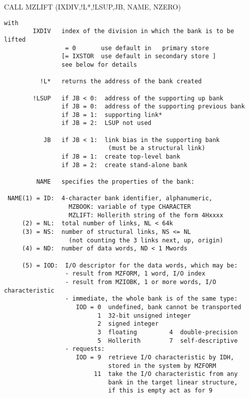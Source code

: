        {CALL MZLIFT (IXDIV,!L*,!LSUP,JB, NAME, NZERO)}
\begin{verbatim}
with
        IXDIV   index of the division in which the bank is to be lifted
                 = 0       use default in   primary store
                [= IXSTOR  use default in secondary store ]
                see below for details

          !L*   returns the address of the bank created

        !LSUP   if JB < 0:  address of the supporting up bank
                if JB = 0:  address of the supporting previous bank
                if JB = 1:  supporting link*
                if JB = 2:  LSUP not used

           JB   if JB < 1:  link bias in the supporting bank
                             (must be a structural link)
                if JB = 1:  create top-level bank
                if JB = 2:  create stand-alone bank

         NAME   specifies the properties of the bank:

 NAME(1) = ID:  4-character bank identifier, alphanumeric,
                  MZBOOK: variable of type CHARACTER
                  MZLIFT: Hollerith string of the form 4Hxxxx
     (2) = NL:  total number of links, NL < 64k
     (3) = NS:  number of structural links, NS <= NL
                  (not counting the 3 links next, up, origin)
     (4) = ND:  number of data words, ND < 1 Mwords

     (5) = IOD:  I/O descriptor for the data words, which may be:
                 - result from MZFORM, 1 word, I/O index
                 - result from MZIOBK, 1 or more words, I/O characteristic
                 - immediate, the whole bank is of the same type:
                    IOD = 0  undefined, bank cannot be transported
                          1  32-bit unsigned integer
                          2  signed integer
                          3  floating         4  double-precision
                          5  Hollerith        7  self-descriptive
                 - requests:
                    IOD = 9  retrieve I/O characteristic by IDH,
                             stored in the system by MZFORM
                         11  take the I/O characteristic from any
                             bank in the target linear structure,
                             if this is empty act as for 9
\end{verbatim}

